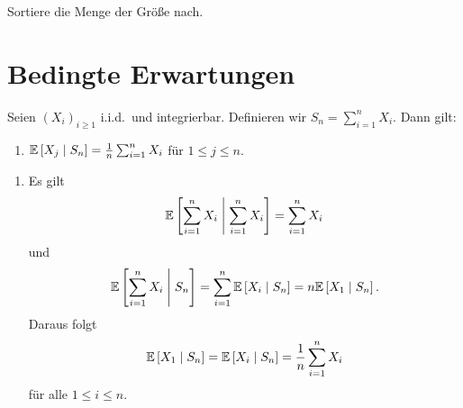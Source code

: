 \solution Sortiere die Menge der Größe nach. 



\section{Bedingte Erwartungen}



Seien $\left( X_i \right)_{i\geq 1}$ i.i.d.\ und integrierbar. Definieren wir 
$S_n = \sum_{i=1}^{n} X_i$. Dann gilt:
\begin{enumerate}
    \item $\mathbb{E} \left[ X_j \;\middle\vert\; S_n \right] = \frac{1}{n} \sum_{i=1}^{n} X_i$
        für $1\leq j \leq n$.
\end{enumerate}

\solution 
\begin{enumerate}
    \item Es gilt
        \begin{equation*}
            \mathbb{E} \left[ \sum_{i=1}^{n} X_i \;\middle\vert\; \sum_{i=1}^{n} X_i \right] 
            = \sum_{i=1}^{n} X_i
        \end{equation*}
        und
        \begin{equation*}
            \mathbb{E} \left[  \sum_{i=1}^{n} X_i \;\middle\vert\; S_n \right] =
            \sum_{i=1}^{n} \mathbb{E} \left[ X_i \;\middle\vert\; S_n \right] = 
            n \mathbb{E} \left[ X_1 \;\middle\vert\; S_n \right].
        \end{equation*}
        Daraus folgt
        \begin{equation*}
             \mathbb{E} \left[ X_1 \;\middle\vert\; S_n \right] = \mathbb{E} \left[ X_i \;\middle\vert\; S_n \right] =
             \frac{1}{n} \sum_{i=1}^{n} X_i
        \end{equation*}
        für alle $1 \leq i \leq n$. 
\end{enumerate}



